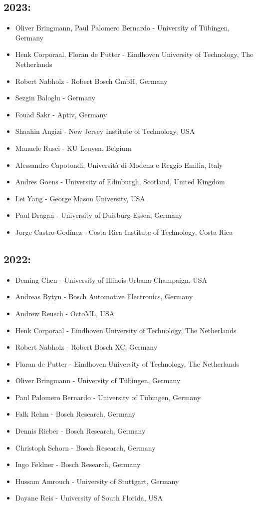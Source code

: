 \documentclass[sigconf]{acmart}
\begin{document}
\subsection*{2023:}
\begin{itemize}
	\item Oliver Bringmann, Paul Palomero Bernardo - University of Tübingen, Germany
	\item Henk Corporaal, Floran de Putter - Eindhoven University of Technology, The Netherlands
	\item Robert Nabholz - Robert Bosch GmbH, Germany
	\item Sezgin Baloglu - Germany
	\item Fouad Sakr - Aptiv, Germany
	\item Shaahin Angizi - New Jersey Institute of Technology, USA
	\item Manuele Rusci - KU Leuven, Belgium
	\item Alessandro Capotondi, Università di Modena e Reggio Emilia, Italy
	\item Andres Goens - University of Edinburgh, Scotland, United Kingdom
	\item Lei Yang - George Mason University, USA
	\item Paul Dragan - University of Duisburg-Essen, Germany
 	\item Jorge Castro-Godinez - Costa Rica Institute of Technology, Costa Rica
\end{itemize}

\subsection*{2022:}
\begin{itemize}
	\item Deming Chen - University of Illinois Urbana Champaign, USA
	\item Andreas Bytyn - Bosch Automotive Electronics, Germany
	\item Andrew Reusch - OctoML, USA
	\item Henk Corporaal - Eindhoven University of Technology, The Netherlands
	\item Robert Nabholz - Robert Bosch XC, Germany
	\item Floran de Putter - Eindhoven University of Technology, The Netherlands
	\item Oliver Bringmann - University of Tübingen, Germany
	\item Paul Palomero Bernardo - University of Tübingen, Germany
	\item Falk Rehm - Bosch Research, Germany
	\item Dennis Rieber - Bosch Research, Germany
	\item Christoph Schorn - Bosch Research, Germany
	\item Ingo Feldner - Bosch Research, Germany
	\item Hussam Amrouch - University of Stuttgart, Germany
	\item Dayane Reis - University of South Florida, USA
\end{itemize}
\end{document}
